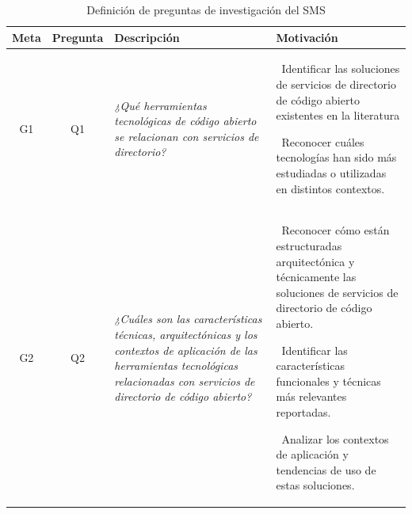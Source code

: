 \begin{table}[H]
	\centering
	\caption{Definición de preguntas de investigación del SMS}
	\label{tab:preguntas}

	\renewcommand{\arraystretch}{1.2}
	\fontsize{9pt}{10pt}\selectfont

	\begin{tabularx}{\textwidth}{|c|c|X|X|}
		\hline
		\textbf{Meta}                                                                                                                                                                                 &
		\textbf{Pregunta}                                                                                                                                                                             &
		\textbf{Descripción}                                                                                                                                                                          &
		\textbf{Motivación}
		\\
		\hline
		G1                                                                                                                                                                                            &
		Q1                                                                                                                                                                                            &
		\textit{¿Qué herramientas tecnológicas de código abierto se relacionan con servicios de directorio?}                                                                                          &
		\textbullet\ Identificar las soluciones de servicios de directorio de código abierto existentes en la literatura

		\textbullet\ Reconocer cuáles tecnologías han sido más estudiadas o utilizadas en distintos contextos.
		\\
		\hline
		G2                                                                                                                                                                                            &
		Q2                                                                                                                                                                                            &
		\textit{¿Cuáles son las características técnicas, arquitectónicas y los contextos de aplicación de las herramientas tecnológicas relacionadas con servicios de directorio de código abierto?} &
		\textbullet\ Reconocer cómo están estructuradas arquitectónica y técnicamente las soluciones de servicios de directorio de código abierto.

		\textbullet\ Identificar las características funcionales y técnicas más relevantes reportadas.

		\textbullet\ Analizar los contextos de aplicación y tendencias de uso de estas soluciones.
		\\
		\hline
	\end{tabularx}
\end{table}
